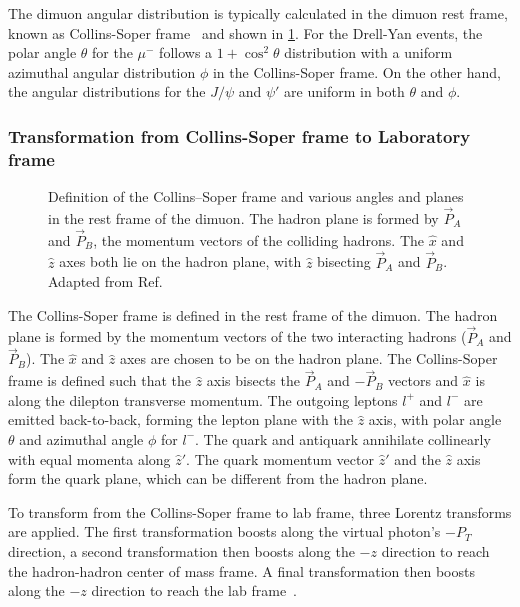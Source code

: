 \documentclass[../main.tex]{subfiles}
\begin{document}
The dimuon angular distribution is typically calculated in the dimuon rest frame, known as
Collins-Soper frame~\cite{collins1977} and shown in \cref{fig:cs_frame}.
For the Drell-Yan events, the polar angle $\theta$ for the $\mu^-$ follows
a $1+\cos^2\theta$ distribution with a uniform azimuthal angular distribution $\phi$ in the Collins-Soper frame.
On the other hand, the angular distributions for the $J/\psi$ and $\psi'$ are uniform in
both $\theta$ and $\phi$.

\subsubsection{Transformation from Collins-Soper frame to Laboratory frame}
\begin{figure}[h!]
	\centering
	
	\caption{Definition of the Collins–Soper frame and various angles and planes in the rest frame of the dimuon.
		The hadron plane is formed by $\vec{P}_A$ and $\vec{P}_B$, the momentum vectors of the colliding hadrons.
		The $\hat{x}$ and $\hat{z}$ axes both lie on the hadron plane, with $\hat{z}$ bisecting $\vec{P}_A$ and
		$\vec{P}_B$. Adapted from Ref.~\cite{peng2019}}
	\label{fig:cs_frame}
\end{figure}
The Collins-Soper frame is defined in the rest frame of the dimuon.
The hadron plane is formed by the momentum vectors of the two interacting hadrons
($\vec{P}_A$ and $\vec{P}_B$). The $\hat{x}$ and $\hat{z}$ axes are chosen to be on the hadron plane.
The Collins-Soper frame is defined such that the $\hat{z}$ axis bisects the $\vec{P}_A$ and $-\vec{P}_B$
vectors and $\hat{x}$ is along the dilepton transverse momentum.
The outgoing leptons $l^+$ and $l^-$ are emitted back-to-back, forming the lepton plane with the $\hat{z}$ axis,
with polar angle $\theta$ and azimuthal angle $\phi$ for $l^-$.
The quark and antiquark annihilate collinearly with equal momenta along $\hat{z}'$.
The quark momentum vector $\hat{z}'$ and the $\hat{z}$ axis form the quark plane, which can be different from the
hadron plane.

To transform from the Collins-Soper frame to lab frame, three Lorentz transforms are applied.
The first transformation boosts along the virtual photon's $-P_T$ direction, a second transformation then
boosts along the $-z$ direction to reach the hadron-hadron center of mass frame. A final transformation
then boosts along the $-z$ direction to reach the lab frame~\cite{Don-1926}.
\end{document}
